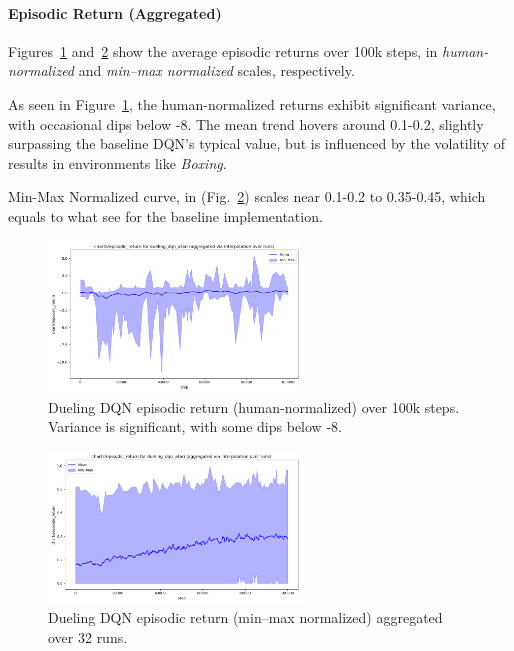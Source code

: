 \paragraph{Episodic Return (Aggregated)}
Figures~\ref{fig:dueling_return_human} and~\ref{fig:dueling_return_minmax} show 
the average episodic returns over 100k steps, in \emph{human-normalized} and 
\emph{min--max normalized} scales, respectively. 

As seen in  Figure~\ref{fig:dueling_return_human}, the human-normalized returns exhibit significant variance, with occasional dips below -8. The mean trend hovers around 0.1-0.2, slightly surpassing the baseline DQN's typical value, but is influenced by the volatility of results in environments like \emph{Boxing}.

Min-Max Normalized curve, in (Fig.~\ref{fig:dueling_return_minmax}) scales near 0.1-0.2 to 0.35-0.45, which equals to what see for the baseline implementation.

\begin{figure}
	\centering
	\includegraphics[width=0.6\textwidth]{figures/dueling_dqn/charts_episodic_return_human_dueling_dqn_atari.png}
	\caption{Dueling DQN episodic return (human-normalized) over 100k steps. 
		Variance is significant, with some dips below -8.}
	\label{fig:dueling_return_human}
\end{figure}

\begin{figure}
	\centering
	\includegraphics[width=0.6\textwidth]{figures/dueling_dqn/charts_episodic_return_minmax_dueling_dqn_atari.png}
	\caption{Dueling DQN episodic return (min--max normalized) aggregated over 32 runs.}
	\label{fig:dueling_return_minmax}
\end{figure}


